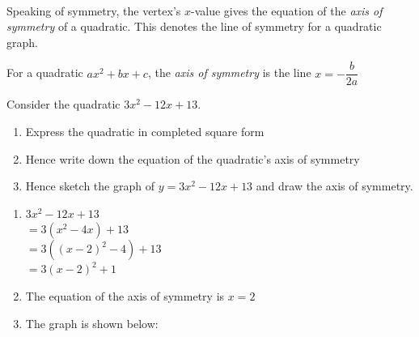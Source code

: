 \documentclass[12pt, a4paper, titlepage, twoside]{article}
\newcounter{excount}[subsection]
\begin{document}
	\paragraph{}
	Speaking of symmetry, the vertex's $x$-value gives the equation of the \textit{axis of symmetry} of a quadratic. This denotes
	the line of symmetry for a quadratic graph.\\
	
	\begin{kp}
		For a quadratic $ax^2 + bx + c$, the \textit{axis of symmetry} is the line $x = -\dfrac{b}{2a}$
	\end{kp}	
	
	\begin{ex}
		Consider the quadratic $3x^2 - 12x + 13$.
		
		\begin{enumerate}[label=\textbf{(\alph*)}]
			\item Express the quadratic in completed square form
			\item Hence write down the equation of the quadratic's axis of symmetry
			\item Hence sketch the graph of $y = 3x^2 - 12x + 13$ and draw the axis of symmetry.
		\end{enumerate}
		
		\hfill
		\tcbline
		\hfill
		
		\begin{enumerate}[label=\textbf{(\alph*)}]
			\item $3x^2 - 12x + 13$\\
			$= 3(x^2 - 4x) + 13$\\
			$= 3((x-2)^2 - 4) + 13$\\
			$= 3(x-2)^2 + 1$
			
			\item The equation of the axis of symmetry is $x = 2$
			
			\item The graph is shown below:
			

\end{enumerate}
\end{ex}
\end{document}
